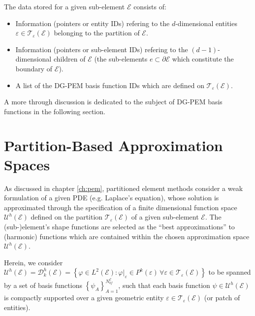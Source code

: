 	The data stored for a given sub-element $\mathcal{E}$ consists of:
	\begin{itemize}
		\item Information (pointers or entity IDs) refering to the $d$-dimensional entities $\varepsilon \in \mathcal{T}_\varepsilon (\mathcal{E})$ belonging to the partition of $\mathcal{E}$.
		\item Information (pointers or sub-element IDs) refering to the $(d-1)$-dimensional children of $\mathcal{E}$ (the sub-elements $e \subset \partial \mathcal{E}$ which constitute the boundary of $\mathcal{E}$).
		\item A list of the DG-PEM basis function IDs which are defined on $\mathcal{T}_\varepsilon (\mathcal{E})$.
	\end{itemize}
	
	A more through discussion is dedicated to the subject of DG-PEM basis functions in the following section.
	
\section{Partition-Based Approximation Spaces}

		As discussed in chapter \ref{ch:pem}, partitioned element methods consider a weak formulation of a given PDE (e.g. Laplace's equation), whose solution is approximated through the specification of a finite dimensional function space $\mathcal{U}^h (\mathcal{E})$ defined on the partition $\mathcal{T}_{\varepsilon} (\mathcal{E})$ of a given sub-element $\mathcal{E}$. The (sub-)element's shape functions are selected as the ``best approximations'' to (harmonic) functions which are contained within the chosen approximation space $\mathcal{U}^h (\mathcal{E})$.
		
		Herein, we consider $\mathcal{U}^h (\mathcal{E}) = \mathcal{D}^h_k (\mathcal{E}) = \left\{ \varphi \in L^2 (\mathcal{E}) : \varphi|_{\varepsilon} \in P^k (\varepsilon) \, \forall \varepsilon \in \mathcal{T}_\varepsilon (\mathcal{E}) \right\}$ to be spanned by a set of basis functions $\left\{ \psi_A \right\}_{A=1}^{N^{\mathcal{E}}_{bf}}$, such that each basis function $\psi \in \mathcal{U}^h (\mathcal{E})$ is compactly supported over a given geometric entity $\varepsilon \in \mathcal{T}_\varepsilon (\mathcal{E})$ (or patch of entities).
		
